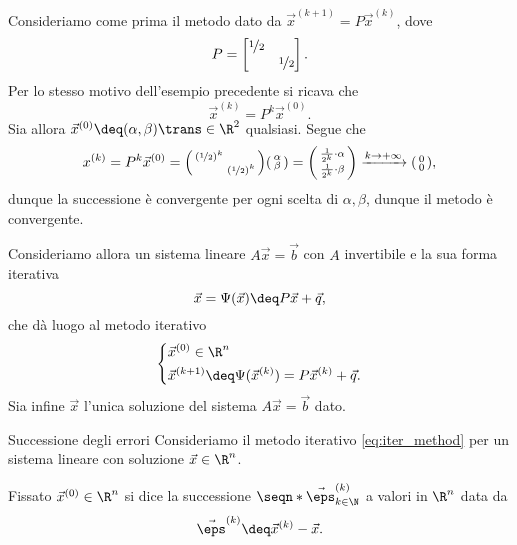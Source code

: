 \begin{example}
    Consideriamo come prima il metodo dato da $\vec x^{(k+1)} = P\vec x^{(k)}$, dove \[
        P = \begin{bmatrix}
            \nicefrac12 & \\
            & \nicefrac12
        \end{bmatrix}.
    \] Per lo stesso motivo dell'esempio precedente si ricava che \[
        \vec x^{(k)} = P^k\vec x^{(0)}.
    \] Sia allora $\vec x^{(0)} \deq (\alpha, \beta)\trans \in \R^2$ qualsiasi. Segue che \[
        x^{(k)} = P^k\vec x^{(0)} = \begin{psmallmatrix}
            (\nicefrac12)^k & \\
            & (\nicefrac12)^k
        \end{psmallmatrix}\begin{psmallmatrix}
            \alpha \\ \beta
        \end{psmallmatrix} = \begin{psmallmatrix}
            \frac{1}{2^k}\cdot \alpha \\
            \frac{1}{2^k}\cdot \beta
        \end{psmallmatrix} \xrightarrow{k \to +\infty} \begin{psmallmatrix}
            0 \\ 0
        \end{psmallmatrix},
    \] dunque la successione è convergente per ogni scelta di $\alpha, \beta$, dunque il metodo è convergente. 
\end{example}

Consideriamo allora un sistema lineare $A\vec x = \vec b$ con $A$ invertibile e la sua forma iterativa \[
    \vec x = \Psi(\vec x) \deq P\vec x + \vec q,
\] che dà luogo al metodo iterativo \begin{equation}
    \label{eq:iter_method}
    \left\{
        \begin{aligned}
            &\vec x^{(0)} \in \R^n \\
            &\vec x^{(k+1)} \deq \Psi(\vec x^{(k)}) = P\vec x^{(k)} + \vec q.
        \end{aligned}
    \right.
\end{equation}
Sia infine $\vec x$ l'unica soluzione del sistema $A\vec x = \vec b$ dato.

\begin{definition}
    {Successione degli errori}{}
    Consideriamo il metodo iterativo \eqref{eq:iter_method} per un sistema lineare con soluzione $\vec x \in \R^n$. 
    
    Fissato $\vec x^{(0)} \in \R^n$ si dice  la successione $\seqn*{\vec \eps^{(k)}}_{k \in \N}$ a valori in $\R^n$ data da \[
        \vec \eps^{(k)} \deq \vec x^{(k)} - \vec x.
    \]
\end{definition}

